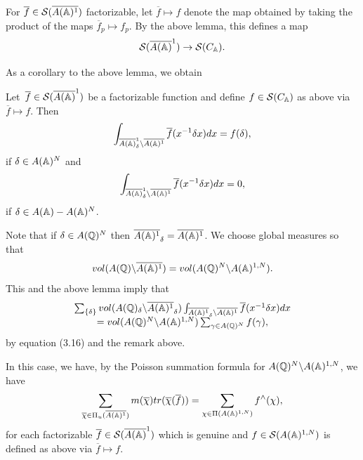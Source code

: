 For $\overline{f}\in {\cal{S}}(\overline{A({\Bbb{A}})^1})$
factorizable, let $\overline{f}\longmapsto f$ denote the map
obtained by taking the
product of the maps $\overline{f}_p\longmapsto f_p$.
By the above lemma, this defines a map 
\begin{equation}
{\cal{S}}(\overline{A({\Bbb{A}})}^1)\rightarrow {\cal{S}}(C_{{\Bbb{A}}}).
\end{equation}

As a corollary to the above lemma, we obtain

\begin{lemma}
Let\ $\overline{f}\in {\cal{S}}(\overline{A({\Bbb{A}})}^1)$ be a
factorizable function and define
$f\in {\cal{S}}(C_{\Bbb{A}})$ as above via
$\overline{f}\longmapsto f$. Then 
\[
\int_{\overline{A({\Bbb{A}})}_\delta ^1
\backslash \overline{A({\Bbb{A}})^1}}\overline{f}(x^{-1}\delta x)dx
=f(\delta ),
\]
if $\delta\in A({\Bbb{A}})^N$ and
\[
\int_{\overline{A({\Bbb{A}})}_\delta ^1
\backslash \overline{A({\Bbb{A}})^1}}\overline{f}(x^{-1}\delta x)dx
=0,
\]
if $\delta\in A({\Bbb{A}})-A({\Bbb{A}})^N$.
\end{lemma}

Note that if $\delta\in A({\Bbb{Q}})^N$ then
$\overline{A({\Bbb{A}})^1}_\delta=\overline{A({\Bbb{A}})^1}$.
We choose global measures so that
\[
vol(A({\Bbb{Q}}) \backslash \overline{A({\Bbb{A}})^1})
=vol(A({\Bbb{Q}})^N \backslash A({\Bbb{A}})^{1,N}).
\]
This and the above lemma imply that 
\begin{equation}
\begin{array}{c}
\sum_{\{\delta \}}
vol(A({\Bbb{Q}})_\delta \backslash \overline{A({\Bbb{A}})^1}_{\delta })
\int_{\overline{A({\Bbb{A}})^1}_{\delta }\backslash 
\overline{A({\Bbb{A}})^1}}
\overline{f}(x^{-1}\delta x)dx \\ 
=vol(A({\Bbb{Q}})^N \backslash A({\Bbb{A}})^{1,N})
\sum_{\gamma \in A({\Bbb{Q}})^N}
f(\gamma ),
\end{array}
\end{equation}
by equation (3.16) and the remark above.

In this case, we have, by the Poisson summation formula for
$A({\Bbb{Q}})^N\backslash A({\Bbb{A}})^{1,N}$, we have 
\begin{equation}
\sum_{\overline{\chi }\in
\Pi_u (\overline{A({\Bbb{A}})^1})}m(\overline{\chi })
tr(\overline{\chi }(\overline{f}))
=\sum_{\chi \in \Pi (A({\Bbb{A}})^{1,N})}
f^{\wedge }(\chi ),
\end{equation}
for each factorizable
$\overline{f}\in {\cal{S}}(\overline{A({\Bbb{A}})}^1)$
which is genuine and $f\in {\cal{S}}(A({\Bbb{A}})^{1,N})$
is defined as above
via $\overline{f}\longmapsto f$.

